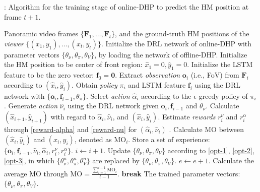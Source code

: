 \documentclass[10pt,journal,compsoc]{IEEEtran}
\begin{document}
\begin{algorithm}
   \caption{\hspace{-.3em}: Algorithm for the training stage of online-DHP to predict the HM position at frame $t+1$.}
   \label{online-DHP-algorithm-training}
   \footnotesize
\begin{algorithmic}[1]
    Panoramic video frames $\{\mathbf{F}_1, \ldots, \mathbf{F}_t \}$, and the ground-truth HM positions of the \textit{viewer} $\{(x_{1},y_{1}),\ldots, (x_{t},y_{t})\}$.
   \STATE Initialize the DRL network of online-DHP with parameter vectors $\{ \theta_{{\nu}}, \theta_{{\pi}}, \theta_{V} \}$, by loading the network of offline-DHP.
       \STATE Initialize the HM position to be center of front region: $\hat{x}_1=0,\hat{y}_1=0$.
       \STATE Initialize the LSTM feature to be the zero vector: $\mathbf{f}_0=\mathbf{0}$.
           \STATE Extract \textit{observation} $\mathbf{o}_i$ (i.e., FoV) from $\mathbf{F}_i$ according to $(\hat{x}_{i},\hat{y}_{i})$.
           \STATE Obtain \textit{policy} $\pi_{i}$ and LSTM feature $\mathbf{f}_{i}$ using the DRL network with $\{\mathbf{o}_i, \mathbf{f}_{i-1}, \theta_{\pi}\}$.
           \STATE Select \textit{action} $\hat{\alpha}_{i}$ according to the $\epsilon$-greedy policy of $\pi_{i}$.
           \STATE Generate \textit{action} $\hat{\nu}_{i}$ using the DRL network given $\mathbf{o}_{i}, \mathbf{f}_{i-1}$ and $ \theta_{\nu}$.
           \STATE Calculate $(\hat{x}_{i+1}, \hat{y}_{i+1})$ with regard to $\hat{\alpha}_{i},\hat{\nu}_{i}$, and $(\hat{x}_{i}, \hat{y}_{i})$.
           \STATE Estimate \textit{rewards} $r^{\nu}_{i}$ and $ r^{\alpha}_{i}$ through \eqref{reward-alpha} and \eqref{reward-nu} for $(\hat{\alpha}_{i},\hat{\nu}_{i})$ .
           \STATE Calculate MO between $(\hat{x}_{i},\hat{y}_{i})$ and $(x_{i},y_{i})$, denoted as $\text{MO}_i$.
           \STATE Store a set of experience: $\{ \mathbf{o}_{i}, \! \mathbf{f}_{i-1},\! \hat{\nu}_{i},\! \hat{\alpha}_{i},\! r^{\nu}_{i},\! r^{\alpha}_{i} \}$.
           \STATE $i \leftarrow i+1$.
       \ENDFOR
       \STATE Update $\{ \theta_{\nu}, \theta_{\pi}, \theta_{V} \}$ according to \eqref{opt-1}, \eqref{opt-2}, \eqref{opt-3}, in which $\{ \theta^{n}_{\nu}, \theta^{n}_{\pi}, \theta^{n}_{V} \}$ are replaced by $\{ \theta_{\nu}, \theta_{\pi}, \theta_{V} \}$.
       \STATE $e \leftarrow e+1$.
       \STATE Calculate the average MO through $\text{MO} =  \frac{\sum_{i=1}^{t-1} \text{MO}_{i}}{t-1}$.
           \STATE \textbf{break}
       \ENDIF
  \ENDFOR
   The trained parameter vectors: $\{ \theta_{\nu}, \theta_{\pi}, \theta_{V} \}$.
\end{algorithmic}
\end{algorithm}
\vspace{-1em}
\end{document}
